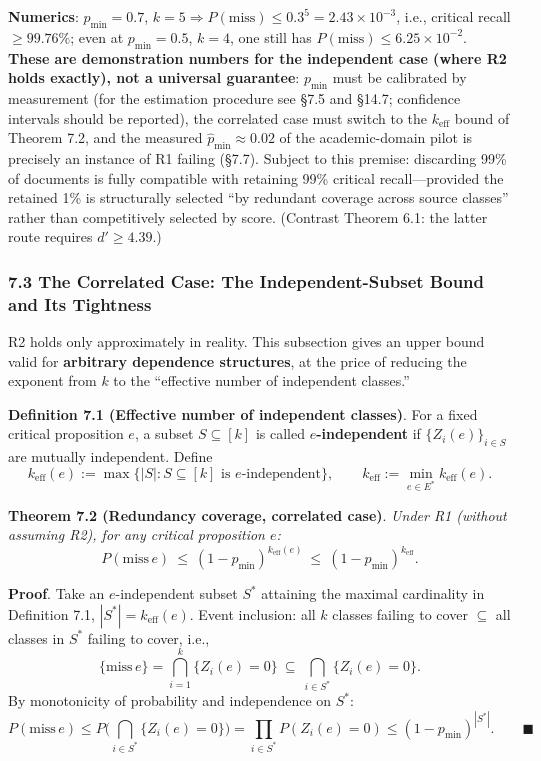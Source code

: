 \documentclass[
  11pt]{article}
\begin{document}
\textbf{Numerics}: \(p_{\min} = 0.7\),
\(k = 5 \Rightarrow P(\mathrm{miss}) \le 0.3^5 = 2.43\times 10^{-3}\),
i.e., critical recall \(\ge 99.76\%\); even at \(p_{\min} = 0.5\),
\(k = 4\), one still has \(P(\mathrm{miss}) \le 6.25\times10^{-2}\).
\textbf{These are demonstration numbers for the independent case (where
R2 holds exactly), not a universal guarantee}: \(p_{\min}\) must be
calibrated by measurement (for the estimation procedure see §7.5 and
§14.7; confidence intervals should be reported), the correlated case
must switch to the \(k_{\mathrm{eff}}\) bound of Theorem 7.2, and the
measured \(\hat p_{\min} \approx 0.02\) of the academic-domain pilot is
precisely an instance of R1 failing (§7.7). Subject to this premise:
discarding 99\% of documents is fully compatible with retaining 99\%
critical recall---provided the retained 1\% is structurally selected
``by redundant coverage across source classes'' rather than
competitively selected by score. (Contrast Theorem 6.1: the latter route
requires \(d' \ge 4.39\).)

\subsubsection{7.3 The Correlated Case: The Independent-Subset Bound and
Its
Tightness}\label{the-correlated-case-the-independent-subset-bound-and-its-tightness}

R2 holds only approximately in reality. This subsection gives an upper
bound valid for \textbf{arbitrary dependence structures}, at the price
of reducing the exponent from \(k\) to the ``effective number of
independent classes.''

\textbf{Definition 7.1 (Effective number of independent classes)}. For a
fixed critical proposition \(e\), a subset \(S \subseteq [k]\) is called
\textbf{\(e\)-independent} if \(\{Z_i(e)\}_{i \in S}\) are mutually
independent. Define
\[k_{\mathrm{eff}}(e) := \max\{|S| : S \subseteq [k] \text{ is } e\text{-independent}\}, \qquad k_{\mathrm{eff}} := \min_{e \in E^*} k_{\mathrm{eff}}(e).\]

\textbf{Theorem 7.2 (Redundancy coverage, correlated case)}. \emph{Under
R1 (without assuming R2), for any critical proposition \(e\):}
\[P(\mathrm{miss}\, e) \ \le\ (1 - p_{\min})^{k_{\mathrm{eff}}(e)} \ \le\ (1 - p_{\min})^{k_{\mathrm{eff}}}.\]

\textbf{Proof}. Take an \(e\)-independent subset \(S^*\) attaining the
maximal cardinality in Definition 7.1, \(|S^*| = k_{\mathrm{eff}}(e)\).
Event inclusion: all \(k\) classes failing to cover \(\subseteq\) all
classes in \(S^*\) failing to cover, i.e.,
\[\{\mathrm{miss}\, e\} = \bigcap_{i=1}^k \{Z_i(e)=0\} \ \subseteq\ \bigcap_{i \in S^*} \{Z_i(e)=0\}.\]
By monotonicity of probability and independence on \(S^*\):
\[P(\mathrm{miss}\, e) \le P\Big(\bigcap_{i\in S^*}\{Z_i(e)=0\}\Big) = \prod_{i \in S^*} P(Z_i(e)=0) \le (1-p_{\min})^{|S^*|}. \qquad\blacksquare\]
\end{document}
